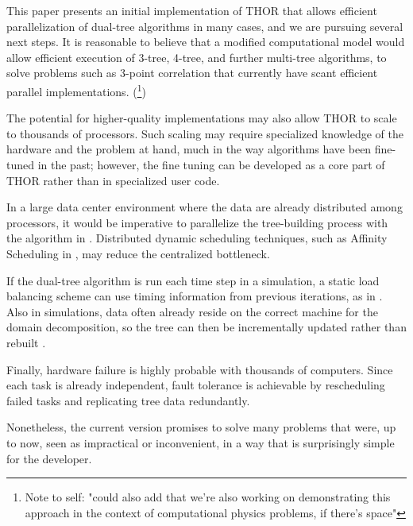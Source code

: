 \documentclass[twoside,leqno,twocolumn]{article}
\newcommand{\authornote}[1]{(\footnote{Note to self: #1})}
\newcommand{\authorsnote}[1]{\authornote{#1}}
\begin{document}
This paper presents an initial implementation of THOR that allows efficient parallelization of dual-tree algorithms in many cases, and we are pursuing several next steps.
It is reasonable to believe that a modified computational model would allow efficient execution of 3-tree, 4-tree, and further multi-tree algorithms, to solve problems such as 3-point correlation that currently have scant efficient parallel implementations.
\authorsnote{"could also add that we're also working on demonstrating this approach in the context of computational physics problems, if there's space"}

The potential for higher-quality implementations may also allow THOR to scale to thousands of processors.
Such scaling may require specialized knowledge of the hardware and the problem at hand, much in the way algorithms have been fine-tuned in the past; however, the fine tuning can be developed as a core part of THOR rather than in specialized user code.

In a large data center environment where the data are already distributed among processors, it would be imperative to parallelize the tree-building process with the algorithm in \cite{alfuraih00parallel}.
Distributed dynamic scheduling techniques, such as Affinity Scheduling in \cite{markatos92using}, may reduce the centralized bottleneck.

If the dual-tree algorithm is run each time step in a simulation, a static load balancing scheme can use timing information from previous iterations, as in \cite{liu94experiences, salmon_thesis, singh_thesis}.
Also in simulations, data often already reside on the correct machine for the domain decomposition, so the tree can then be incrementally updated rather than rebuilt \cite{liu94experiences}.

Finally, hardware failure is highly probable with thousands of computers.
Since each task is already independent, fault tolerance is achievable by rescheduling failed tasks and replicating tree data redundantly.

Nonetheless, the current version promises to solve many problems that were, up to now, seen as impractical or inconvenient, in a way that is surprisingly simple for the developer.



\end{document}
